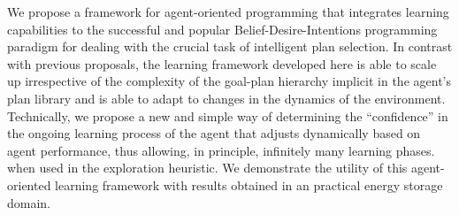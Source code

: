 


We propose a framework for agent-oriented programming that integrates learning capabilities to the successful and popular Belief-Desire-Intentions programming paradigm for dealing with the crucial task of intelligent plan selection.
In contrast with previous proposals, the learning framework developed here is able to scale up irrespective of the complexity of the goal-plan hierarchy implicit in the agent's plan library and is able to adapt to changes in the dynamics of the environment.
Technically, we propose a new and simple way of determining the ``confidence'' in the ongoing learning process of the agent that adjusts dynamically based on agent performance, thus allowing, in principle, infinitely many learning phases. when used in the exploration heuristic. 
%
We demonstrate the utility of this agent-oriented learning framework with results obtained in an practical energy storage domain.


% 
% 
% 
